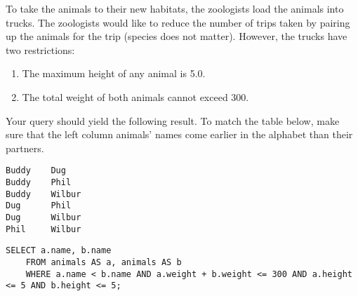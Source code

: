 \begin{blocksection}
\question To take the animals to their new habitats, the zoologists load the animals into trucks. The zoologists would like to reduce the number of trips taken by pairing up the animals for the trip (species does not matter). However, the trucks have two restrictions:
\begin{enumerate}
    \item The maximum height of any animal is 5.0.
    \item The total weight of both animals cannot exceed 300.
\end{enumerate}

Your query should yield the following result. To match the table below, make sure that the left column animals' names come earlier in the alphabet than their partners.

\begin{lstlisting}
Buddy 	 Dug 
Buddy 	 Phil 
Buddy 	 Wilbur 
Dug 	 Phil 
Dug 	 Wilbur 
Phil 	 Wilbur
\end{lstlisting}

\begin{solution}[1in]
\begin{lstlisting}
SELECT a.name, b.name 
    FROM animals AS a, animals AS b 
    WHERE a.name < b.name AND a.weight + b.weight <= 300 AND a.height <= 5 AND b.height <= 5;
\end{lstlisting}
\end{solution}
\end{blocksection}
    